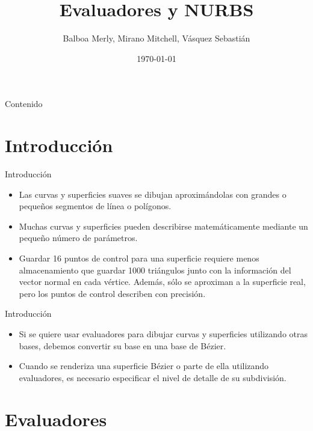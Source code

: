 \documentclass[10.5pt]{beamer}
\title{Evaluadores y NURBS}
\author{Balboa Merly, Mirano Mitchell, Vásquez Sebastián}
\institute{UNMSM--Computación Cientfica}
\date{\today}
\begin{document}
\begin{frame}
\maketitle
\end{frame}


\begin{frame}{Contenido}
    \small
    \tableofcontents
\end{frame}


\section{Introducción}

\begin{frame}{Introducción}
\begin{itemize}
\justifying
    \item  Las curvas y superficies suaves se dibujan aproximándolas con grandes o pequeños segmentos de línea o polígonos.
    \item   Muchas curvas y superficies pueden describirse matemáticamente mediante un pequeño número de parámetros.
    \item   Guardar 16 puntos de control para una superficie requiere menos almacenamiento que guardar 1000 triángulos junto con la información del vector normal en cada vértice. Además, sólo se aproximan a la superficie real, pero los puntos de control describen con precisión.
\end{itemize}
\end{frame}
\begin{frame}{Introducción}
\begin{itemize}
\justifying
    \item  Si se quiere usar evaluadores para dibujar curvas y superficies utilizando otras bases, debemos convertir su base en una base de Bézier.
    \item   Cuando se renderiza una superficie Bézier o parte de ella utilizando evaluadores, es necesario especificar el nivel de detalle de su subdivisión.
\end{itemize}
\end{frame}
\section{Evaluadores}
\end{document}
